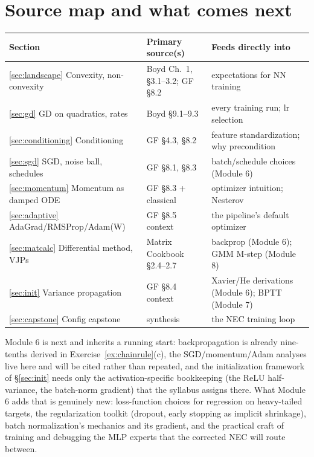 \documentclass[11pt]{article}
\numberwithin{equation}{section}
\theoremstyle{plain}
\theoremstyle{definition}
\theoremstyle{remark}
\begin{document}
\section*{Source map and what comes next}

\begin{center}
\small
\begin{tabular}{@{}lll@{}}
\toprule
Section & Primary source(s) & Feeds directly into \\
\midrule
\ref{sec:landscape} Convexity, non-convexity & Boyd Ch.\ 1, \S3.1--3.2; GF \S8.2 & expectations for NN training \\
\ref{sec:gd} GD on quadratics, rates & Boyd \S9.1--9.3 & every training run; lr selection \\
\ref{sec:conditioning} Conditioning & GF \S4.3, \S8.2 & feature standardization; why precondition \\
\ref{sec:sgd} SGD, noise ball, schedules & GF \S8.1, \S8.3 & batch/schedule choices (Module 6) \\
\ref{sec:momentum} Momentum as damped ODE & GF \S8.3 + classical & optimizer intuition; Nesterov \\
\ref{sec:adaptive} AdaGrad/RMSProp/Adam(W) & GF \S8.5 context & the pipeline's default optimizer \\
\ref{sec:matcalc} Differential method, VJPs & Matrix Cookbook \S2.4--2.7 & backprop (Module 6); GMM M-step (Module 8) \\
\ref{sec:init} Variance propagation & GF \S8.4 context & Xavier/He derivations (Module 6); BPTT (Module 7) \\
\ref{sec:capstone} Config capstone & synthesis & the NEC training loop \\
\bottomrule
\end{tabular}
\end{center}

\medskip
Module 6 is next and inherits a running start: backpropagation is already nine-tenths derived in Exercise~\ref{ex:chainrule}(c), the SGD/momentum/Adam analyses live here and will be cited rather than repeated, and the initialization framework of \S\ref{sec:init} needs only the activation-specific bookkeeping (the ReLU half-variance, the batch-norm gradient) that the syllabus assigns there. What Module 6 adds that is genuinely new: loss-function choices for regression on heavy-tailed targets, the regularization toolkit (dropout, early stopping as implicit shrinkage), batch normalization's mechanics and its gradient, and the practical craft of training and debugging the MLP experts that the corrected NEC will route between.
\end{document}
